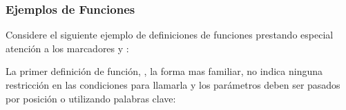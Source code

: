 \documentclass[a4,10pt,spanish]{sphinxmanual}
\begin{document}
\subsubsection{Ejemplos de Funciones}
\label{\detokenize{tutorial/controlflow:function-examples}}
\sphinxAtStartPar
Considere el siguiente ejemplo de definiciones de funciones prestando especial atención a los marcadores \sphinxcode{\sphinxupquote{/}} y \sphinxcode{\sphinxupquote{*}}:

\begin{sphinxVerbatim}[commandchars=\\\{\}]
 
    
  
    
  
    
     
      
\end{sphinxVerbatim}

\sphinxAtStartPar
La primer definición de función, , la forma mas familiar, no indica ninguna restricción en las condiciones para llamarla y los parámetros deben ser pasados por posición o utilizando palabras clave:

\begin{sphinxVerbatim}[commandchars=\\\{\}]

\end{sphinxVerbatim}
\end{document}
